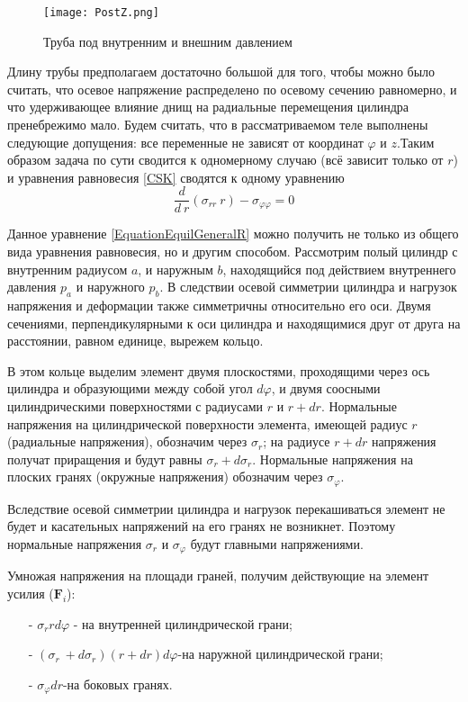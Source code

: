 \documentclass[a4paper,14pt]{extarticle}
\begin{document}
\begin{figure}[ht]
\begin{center}
\texttt{[image: PostZ.png]}
\caption{Труба под внутренним и внешним давлением}	
\label{PostZ}
\end{center}
\end{figure}

Длину трубы предполагаем достаточно большой для того, чтобы можно было считать, что осевое напряжение распределено по осевому сечению равномерно, и что удерживающее влияние днищ на радиальные перемещения цилиндра пренебрежимо мало. Будем считать, что в рассматриваемом теле выполнены следующие допущения: все переменные не зависят от координат $\varphi$ и $z$.Таким образом задача по сути сводится к одномерному случаю (всё зависит только от $r$) и уравнения равновесия \eqref{CSK} сводятся к одному уравнению
\begin{equation}\label{EquationEquilGeneralR}
\frac{d}{d\:r}(\sigma_{rr}\: r)-\sigma_{\varphi\varphi}=0
\end{equation}

Данное уравнение \eqref{EquationEquilGeneralR} можно получить не только из общего вида уравнения равновесия, но и другим способом. Рассмотрим полый цилиндр с внутренним радиусом $a$, и наружным $b$, находящийся под действием внутреннего давления $p_a$ и наружного $p_b$. В следствии осевой симметрии цилиндра и нагрузок напряжения и деформации также симметричны относительно его оси. Двумя сечениями, перпендикулярными к оси цилиндра и находящимися друг от друга на расстоянии, равном единице, вырежем кольцо.

В этом кольце выделим элемент двумя плоскостями, проходящими через ось цилиндра и образующими между собой угол $d\varphi$, и двумя соосными цилиндрическими поверхностями с радиусами $r$ и $r+dr$. Нормальные напряжения на цилиндрической поверхности элемента, имеющей радиус $r$ (радиальные напряжения), обозначим через $\sigma_r$; на радиусе $r+dr$ напряжения получат приращения и будут равны $\sigma_r +d\sigma_r$. Нормальные напряжения на плоских гранях (окружные напряжения) обозначим через $\sigma_{\varphi}$.

Вследствие осевой симметрии цилиндра и нагрузок перекашиваться элемент не будет и касательных напряжений на его гранях не возникнет. Поэтому нормальные напряжения $\sigma_r$ и $\sigma_{\varphi}$ будут главными напряжениями. 

Умножая напряжения на площади граней, получим действующие на элемент усилия ($\textbf{F}_i$):
\begin{itemize}
\item[-]$\sigma_r r d\varphi$ - на внутренней цилиндрической грани;
\item[-]$(\sigma_r\: + d\sigma_r)(r+dr)d\varphi$-на наружной цилиндрической грани;
\item[-]$\sigma_{\varphi}dr$-на боковых гранях.
\end{itemize}
\end{document}
